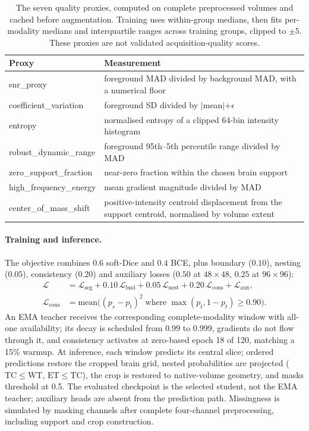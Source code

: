 \begin{table}[t]
\centering
\caption{The seven quality proxies, computed on complete preprocessed volumes and cached before augmentation. Training uses within-group medians, then fits per-modality medians and interquartile ranges across training groups, clipped to $\pm5$. These proxies are not validated acquisition-quality scores.}
\label{tab:proxies}
\scriptsize
\begin{tabular}{lp{5.4cm}}
\toprule
Proxy & Measurement \\
\midrule
snr\_proxy & foreground MAD divided by background MAD, with a numerical floor \\
coefficient\_variation & foreground SD divided by $|$mean$|+\epsilon$ \\
entropy & normalised entropy of a clipped 64-bin intensity histogram \\
robust\_dynamic\_range & foreground 95th--5th percentile range divided by MAD \\
zero\_support\_fraction & near-zero fraction within the chosen brain support \\
high\_frequency\_energy & mean gradient magnitude divided by MAD \\
center\_of\_mass\_shift & positive-intensity centroid displacement from the support centroid, normalised by volume extent \\
\bottomrule
\end{tabular}
\end{table}

\paragraph{Training and inference.}
The objective combines $0.6$ soft-Dice and $0.4$ BCE, plus boundary ($0.10$), nesting ($0.05$), consistency ($0.20$) and auxiliary losses ($0.50$ at $48{\times}48$, $0.25$ at $96{\times}96$):
\begin{align*}
\mathcal{L} &= \mathcal{L}_{\mathrm{seg}} + 0.10\,\mathcal{L}_{\mathrm{bnd}} + 0.05\,\mathcal{L}_{\mathrm{nest}}
 + 0.20\,\mathcal{L}_{\mathrm{cons}} + \mathcal{L}_{\mathrm{aux}},\\
\mathcal{L}_{\mathrm{cons}} &= \mathrm{mean}\big((p_s-p_t)^2 \;\text{where}\; \max(p_t,1-p_t)\ge 0.90\big).
\end{align*}
An EMA teacher receives the corresponding complete-modality window with all-one availability; its decay is scheduled from 0.99 to 0.999, gradients do not flow through it, and consistency activates at zero-based epoch 18 of 120, matching a 15\% warmup. At inference, each window predicts its central slice; ordered predictions restore the cropped brain grid, nested probabilities are projected ($\mathrm{TC}\le\mathrm{WT}$, $\mathrm{ET}\le\mathrm{TC}$), the crop is restored to native-volume geometry, and masks threshold at 0.5. The evaluated checkpoint is the selected student, not the EMA teacher; auxiliary heads are absent from the prediction path. Missingness is simulated by masking channels after complete four-channel preprocessing, including support and crop construction.

